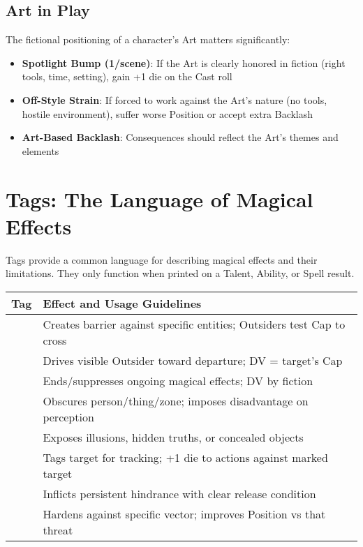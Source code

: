\subsection*{Art in Play}

The fictional positioning of a character's Art matters significantly:

\begin{itemize}
    \item \textbf{Spotlight Bump (1/scene)}: If the Art is clearly honored in fiction (right tools, time, setting), gain +1 die on the Cast roll
    \item \textbf{Off-Style Strain}: If forced to work against the Art's nature (no tools, hostile environment), suffer worse Position or accept extra Backlash
    \item \textbf{Art-Based Backlash}: Consequences should reflect the Art's themes and elements
\end{itemize}

\section*{Tags: The Language of Magical Effects}

Tags provide a common language for describing magical effects and their limitations. They only function when printed on a Talent, Ability, or Spell result.

\begin{fatebox}
\begin{tabularx}{\textwidth}{lX}
\toprule
\textbf{Tag} & \textbf{Effect and Usage Guidelines} \\
\midrule
[WARD] & Creates barrier against specific entities; Outsiders test Cap to cross \\
[BANISH] & Drives visible Outsider toward departure; DV = target's Cap \\
[DISPEL] & Ends/suppresses ongoing magical effects; DV by fiction \\
[VEIL] & Obscures person/thing/zone; imposes disadvantage on perception \\
[REVEAL] & Exposes illusions, hidden truths, or concealed objects \\
[MARK] & Tags target for tracking; +1 die to actions against marked target \\
[CURSE] & Inflicts persistent hindrance with clear release condition \\
[FORTIFY] & Hardens against specific vector; improves Position vs that threat \\
\bottomrule
\end{tabularx}
\end{fatebox}

